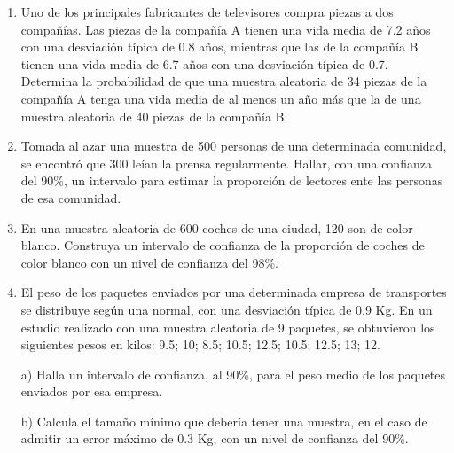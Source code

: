 \begin{adjustwidth}{20pt}{10pt}
\begin{enumerate}[PB. 1. ]
		\hspace{-1cm}\vspace{1cm}
		
	\item 	Uno de los principales fabricantes de televisores compra piezas a dos compañías. Las piezas de la compañía A tienen una vida media de 7.2 años con una desviación típica de 0.8 años, mientras que las de la compañía B tienen una vida media de 6.7 años con una desviación típica de 0.7. Determina la probabilidad de que una muestra aleatoria de 34 piezas de la compañía A tenga una vida media de al menos un año más que la de una muestra aleatoria de 40 piezas de la compañía B.
		
		\hspace{-1cm}\vspace{1cm}
		
	\item 	Tomada al azar una muestra de 500 personas de una determinada comunidad, se encontró que 300 leían la prensa regularmente. Hallar, con una confianza del 90\%, un intervalo para estimar la proporción de lectores ente las personas de esa comunidad.

		
		\hspace{-1cm}\vspace{1cm}
		
	\item 	 En una muestra aleatoria de 600 coches de una ciudad, 120 son de color blanco. Construya un intervalo de confianza de la proporción de coches de color blanco con un nivel de confianza del 98\%.

		
		\hspace{-1cm}\vspace{1cm}
		
	\item 	El peso de los paquetes enviados por una determinada empresa de transportes se distribuye según una normal, con una desviación típica de 0.9 Kg. En un estudio realizado con una muestra aleatoria de 9 paquetes, se obtuvieron los siguientes pesos en kilos: 9.5; 10; 8.5; 10.5; 12.5;  10.5; 12.5; 13; 12.
	
a) Halla un intervalo de confianza, al 90\%, para el peso medio de los paquetes enviados por esa empresa.

b) Calcula el tamaño mínimo que debería tener una muestra, en el caso de admitir un error máximo de 0.3 Kg, con un nivel de confianza del    90\%.


\end{enumerate}
\end{adjustwidth}
